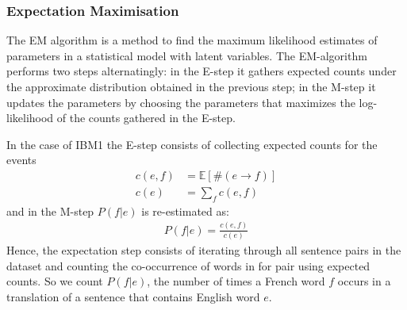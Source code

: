 \documentclass[11pt,a4paper]{article}
\newcommand*\Let[2]{\State #1 $\gets$ #2}
\begin{document}
\subsubsection{Expectation Maximisation}

\label{sec:em1}

The EM algorithm is a method to find the maximum likelihood estimates of parameters in a statistical model with latent variables. The EM-algorithm performs two steps alternatingly: in the E-step it gathers expected counts under the approximate distribution obtained in the previous step; in the M-step it updates the parameters by choosing the parameters that maximizes the log-likelihood of the counts gathered in the E-step.

In the case of IBM1 the E-step consists of collecting expected counts for the events 
\begin{align*}
    c(e,f) &= \mathbb{E}[\#(e \to f)] \\
    c(e) &= \sum_f c(e,f)
\end{align*}
and in the M-step $P(f | e)$ is re-estimated as:
\begin{align*}
    P(f | e) = \frac{c(e,f)}{c(e)}
\end{align*}
Hence, the expectation step consists of iterating through all sentence pairs in the dataset and counting the co-occurrence of words in for pair using expected counts. So we count $P(f | e)$, the number of times a French word $f$ occurs in a translation of a sentence that contains English word $e$. 



        
        
\end{document}
